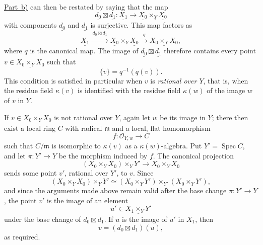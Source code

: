 
\hyperref[proof:sga3-V-4.1-b]{Part~b)} can then be restated by saying that the
map
\[
  \underline{d_0}\boxtimes\underline{d_1}:
  \underline{X_1}\longrightarrow
  \underline{X_0}\times_{\underline Y}\underline{X_0}
\]
with components \(\underline{d_0}\) and \(\underline{d_1}\) is
surjective. This map factors as
\[
  \underline{X_1}
  \xrightarrow{\ \underline{d_0}\boxtimes\underline{d_1}\ }
  \underline{X_0}\times_{\underline Y}\underline{X_0}
  \xrightarrow{\ q\ }
  \underline{X_0\times_YX_0},
\]
where \(q\) is the canonical map. The image of
\(\underline{d_0}\boxtimes\underline{d_1}\) therefore contains every
point \(v\in\underline{X_0\times_YX_0}\) such that
\[
  \{v\}=q^{-1}(q(v)).
\]
This condition is satisfied in particular when \(v\) is
\emph{rational over \(Y\)}, that is, when the residue field
\(\kappa(v)\) is identified with the residue field \(\kappa(w)\) of
the image \(w\) of \(v\) in \(Y\).%

If \(v\in\underline{X_0\times_YX_0}\) is not rational over \(Y\),
again let \(w\)
be its image in \(Y\); there then exist a local ring
\(C\) with radical \(\mathfrak m\) and a local, flat homomorphism
\[
  f:\mathcal O_{Y,w}\longrightarrow C
\]
such that \(C/\mathfrak m\) is isomorphic to \(\kappa(v)\) as a
\(\kappa(w)\)-algebra. Put \(Y'=\operatorname{Spec}C\), and let
\(\pi:Y'\to Y\) be the morphism induced by \(f\). The canonical
projection
\[
  (X_0\times_YX_0)\times_YY'\longrightarrow X_0\times_YX_0
\]
sends some point \(v'\), rational over \(Y'\), to \(v\). Since
\[
  (X_0\times_YX_0)\times_YY'
  \simeq
  (X_0\times_YY')\times_{Y'}(X_0\times_YY'),
\]
and since the arguments made above remain valid after the base change
\(\pi:Y'\to Y\), the point \(v'\) is the image of an element
\[
  u'\in\underline{X_1\times_YY'}
\]
under the base change of \(d_0\boxtimes d_1\). If \(u\) is the image
of \(u'\) in \(X_1\), then
\[
  v=(d_0\boxtimes d_1)(u),
\]
as required.

